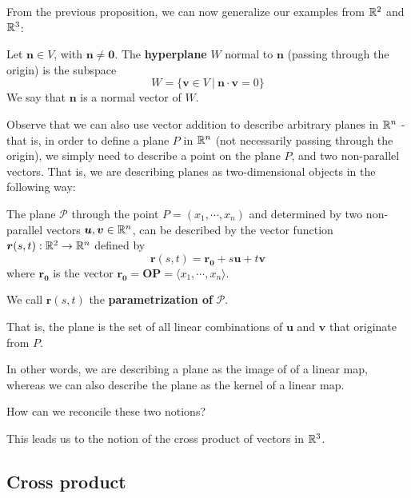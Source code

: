 From the previous proposition, we can now generalize our examples from $\mathbb{R}^2$ and $\mathbb{R}^3$:

\begin{definition}
Let $\bm{n} \in V$, with $\bm{n} \neq \bm{0}$.  The \textbf{hyperplane} $W$ normal to $\bm{n}$ (passing through the origin) is the subspace $$W = \{ \bm{v} \in V \ | \ \bm{n} \cdot \bm{v}  = 0 \}$$
We say that $\bm{n}$ is a normal vector of $W$.
\end{definition}


Observe that we can also use vector addition to describe arbitrary planes in $\mathbb{R}^n$ - that is, in order to define a plane $P$ in $\mathbb{R}^n$ (not necessarily passing through the origin), we simply need to describe a point on the plane $P$, and two non-parallel vectors.  That is, we are describing planes as two-dimensional objects in the following way:

\begin{definition}
    The plane $\mathscr{P}$ through the point $P = (x_1, \cdots, x_n)$  and determined by two non-parallel vectors $\bm{u}, \bm{v} \in \mathbb{R}^n$, can be described by the vector function $\bm{r}(s,t) : \mathbb{R}^2 \to \mathbb{R}^n$ defined by 
    $$\bm{r}(s,t) = \bm{r_0} + s\bm{u} + t\bm{v}$$
    where $\bm{r_0}$ is the vector $\bm{r_0} = \bm{OP} = \langle x_1, \cdots, x_n\rangle$.
    
    We call $\bm{r}(s,t)$ the \textbf{parametrization of} $\mathscr{P}$.
    
    \end{definition}
    
    That is, the plane is the set of all linear combinations of $\bm{u}$ and $\bm{v}$ that originate from $P$.

    \begin{remark}
    In other words, we are describing a plane as the image of of a linear map, whereas we can also describe the plane as the kernel of a linear map.
    \end{remark}


\begin{motivating}
How can we reconcile these two notions?
\end{motivating}

This leads us to the notion of the cross product of vectors in $\mathbb{R}^3$.




\subsection{Cross product}

